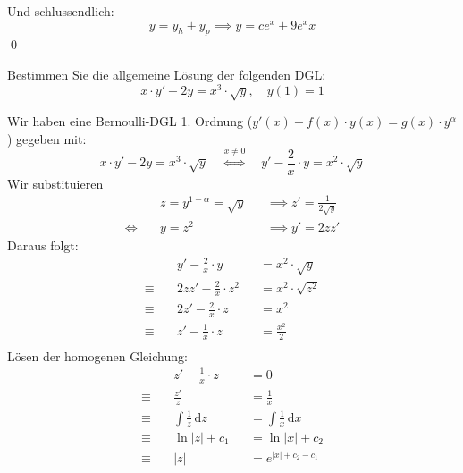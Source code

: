 \documentclass[answers]{exam}
\newcommand{\abs}[1]{\left| #1 \right|}
\renewcommand{\d}{\,\mathrm{d}}
\begin{document}
\begin{questions}
\begin{parts}
\begin{solution}
            Und schlussendlich:
            $$
                y = y_h + y_p \implies y = ce^x + 9e^xx
            $$\qed
        \end{solution}
    \end{parts}

    \newpage
    \question
    Bestimmen Sie die allgemeine Lösung der folgenden DGL:
    $$
        x \cdot y'-2y = x^3 \cdot \sqrt{y}, \quad y(1) = 1
    $$
    \begin{solution}
        Wir haben eine Bernoulli-DGL 1. Ordnung ($y'(x) + f(x) \cdot y(x) = g(x) \cdot y^\alpha$) gegeben mit:
        $$
            x \cdot y'-2y = x^3 \cdot \sqrt{y} \quad \overset{x\neq 0}{\iff} \quad  y' - \frac{2}{x} \cdot y = x^2 \cdot \sqrt{y}
        $$
        Wir substituieren
        $$
            \begin{aligned}
                           & z = y^{1-\alpha} = \sqrt{y} &  & \implies z' = \frac{1}{2\sqrt{y}} \\
                \iff \quad & y = z^2                     &  & \implies y' = 2zz'
            \end{aligned}
        $$
        Daraus folgt:
        $$
            \begin{aligned}
                             & y' - \frac{2}{x} \cdot y     &  & = x^2 \cdot \sqrt{y}                                         \\
                \equiv \quad & 2zz' - \frac{2}{x} \cdot z^2 &  & = x^2 \cdot \sqrt{z^2}                                       \\
                \equiv \quad & 2z' - \frac{2}{x} \cdot z    &  & = x^2                                                        \\
                \equiv \quad & z' - \frac{1}{x} \cdot z     &  & = \frac{x^2}{2}                                              \\
            \end{aligned}
        $$
        Lösen der homogenen Gleichung: 
        $$
        \begin{aligned}
        & z' - \frac{1}{x} \cdot z     &  & = 0 \\
        \equiv \quad & \frac{z'}{z}      &  & = \frac{1}{x}\\
        \equiv \quad & \int \frac{1}{z} \d z      &  & = \int \frac{1}{x} \d x\\
        \equiv \quad & \ln \abs{z} + c_1      &  & = \ln \abs{x} + c_2\\
        \equiv \quad & \abs{z}      &  & = e^{\abs{x} + c_2 - c_1} \\

\end{aligned}$$
\end{solution}
\end{questions}
\end{document}
